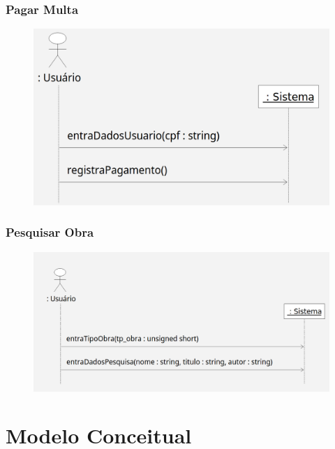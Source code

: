 \documentclass[
	12pt,				%
	openright,			%
	oneside,			%
	a4paper,			%
	english,			%
	brazil				%
	]{abntex2}
\begin{document}
\subsection{Pagar Multa}

\begin{figure}[H]
\includegraphics[width=1\textwidth]{DSSPagaMulta}
\label{fig:figura7}
\end{figure}

\subsection{Pesquisar Obra}

\begin{figure}[H]
\includegraphics[width=1\textwidth]{DSSPesquisarObra}
\label{fig:figura8}
\end{figure}


\chapter{Modelo Conceitual}
\end{document}
